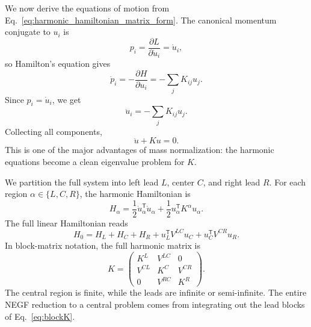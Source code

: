 We now derive the equations of motion from Eq.~\eqref{eq:harmonic_hamiltonian_matrix_form}. The canonical momentum conjugate to $u_i$ is
\begin{equation}
    p_i = \frac{\partial L}{\partial \dot u_i} = \dot u_i,
\end{equation}
so Hamilton's equation gives
\begin{equation}
    \dot p_i = -\frac{\partial H}{\partial u_i} = -\sum_j K_{ij}u_j.
\end{equation}
Since $p_i = \dot u_i$, we get
\begin{equation}
    \ddot u_i = -\sum_j K_{ij}u_j.
    \label{eq:eom_component_harmonic}
\end{equation}
Collecting all components,
\begin{equation}
    \ddot u + Ku = 0.
    \label{eq:eom_matrix_harmonic}
\end{equation}
This is one of the major advantages of mass normalization: the harmonic equations become a clean eigenvalue problem for $K$.

We partition the full system into left lead $L$, center $C$, and right lead $R$. For each region $\alpha \in \{L,C,R\}$, the harmonic Hamiltonian is
\begin{equation}
    H_\alpha = \frac{1}{2}\dot u_\alpha^{\mathsf T}\dot u_\alpha + \frac{1}{2}u_\alpha^{\mathsf T}K^\alpha u_\alpha.
    \label{eq:subsystem_harmonic_hamiltonian}
\end{equation}
The full linear Hamiltonian reads
\begin{equation}
    H_0 = H_L + H_C + H_R + u_L^{\mathsf T}V^{LC}u_C + u_C^{\mathsf T}V^{CR}u_R.
    \label{eq:partitioned_harmonic_hamiltonian}
\end{equation}
In block-matrix notation, the full harmonic matrix is
\begin{equation}
    K =
    \begin{pmatrix}
        K^L & V^{LC} & 0 \\
        V^{CL} & K^C & V^{CR} \\
        0 & V^{RC} & K^R
    \end{pmatrix}.
    \label{eq:blockK}
\end{equation}
The central region is finite, while the leads are infinite or semi-infinite. The entire NEGF reduction to a central problem comes from integrating out the lead blocks of Eq.~\eqref{eq:blockK}.


